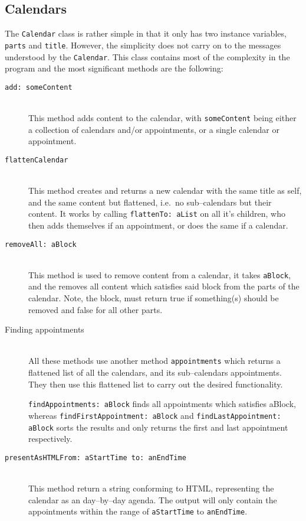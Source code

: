 \subsection{Calendars}
The \texttt{Calendar} class is rather simple in that it only has two instance variables, \texttt{parts} and \texttt{title}.
However, the simplicity does not carry on to the messages understood by the \texttt{Calendar}.
This class contains most of the complexity in the program and the most significant methods are the following:
\begin{description}
    \item[\texttt{add: someContent}]\hfill\\
    This method adds content to the calendar, with \texttt{someContent} being either a collection of calendars and/or appointments, or a single calendar or appointment.
    \item[\texttt{flattenCalendar}]\hfill\\
    This method creates and returns a new calendar with the same title as self, and the same content but flattened, i.e.~no sub--calendars but their content.
    It works by calling \texttt{flattenTo: aList} on all it's children, who then adds themselves if an appointment, or does the same if a calendar.
    \item[\texttt{removeAll: aBlock}]\hfill\\
    This method is used to remove content from a calendar, it takes \texttt{aBlock}, and the removes all content which satisfies said block from the parts of the calendar.
    Note, the block, must return true if something(s) should be removed and false for all other parts.
    \item[Finding appointments]\hfill\\
    All these methods use another method \texttt{appointments} which returns a flattened list of all the calendars, and its sub--calendars appointments.
    They then use this flattened list to carry out the desired functionality.

    \texttt{findAppointments: aBlock} finds all appointments which satisfies aBlock,
    whereas \texttt{findFirstAppointment: aBlock} and \texttt{findLastAppointment: aBlock}
    sorts the results and only returns the first and last appointment respectively.
    \item[\texttt{presentAsHTMLFrom: aStartTime to: anEndTime}]\hfill\\
    This method return a string conforming to HTML, representing the calendar as an day--by--day agenda.
    The output will only contain the appointments within the range of \texttt{aStartTime} to \texttt{anEndTime}.
\end{description}

